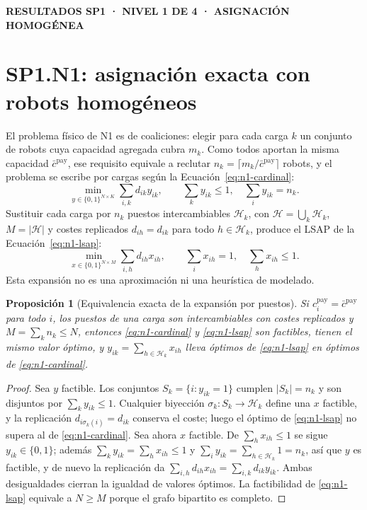 \documentclass[12pt,a4paper]{article}
\newcommand{\leveltag}[1]{%
  \noindent\colorbox{VIUDark}{%
    \parbox{\dimexpr\textwidth-2\fboxsep\relax}{%
      \color{white}\sffamily\bfseries\small #1%
    }%
  }\par\smallskip
}
\newtheorem{n1prop}{Proposición}
\begin{document}
\clearpage

\leveltag{RESULTADOS SP1 · NIVEL 1 DE 4 · ASIGNACIÓN HOMOGÉNEA}
\section*{SP1.N1: asignación exacta con robots homogéneos}

El problema físico de N1 es de coaliciones: elegir para cada carga $k$ un
conjunto de robots cuya capacidad agregada cubra $m_k$. Como todos aportan la
misma capacidad $\bar c^{\mathrm{pay}}$, ese requisito equivale a reclutar
$n_k=\lceil m_k/\bar c^{\mathrm{pay}}\rceil$ robots, y el problema se escribe
por cargas según la Ecuación~\eqref{eq:n1-cardinal}:
\begin{equation}
\label{eq:n1-cardinal}
 \min_{y\in\{0,1\}^{N\times K}}\sum_{i,k}d_{ik}y_{ik},\qquad
 \sum_{k}y_{ik}\leq1,\quad \sum_{i}y_{ik}=n_k .
\end{equation}
Sustituir cada carga por $n_k$ puestos intercambiables $\mathcal H_k$, con
$\mathcal H=\bigcup_k\mathcal H_k$, $M=|\mathcal H|$ y costes replicados
$d_{ih}=d_{ik}$ para todo $h\in\mathcal H_k$, produce el LSAP de la
Ecuación~\eqref{eq:n1-lsap}:
\begin{equation}
\label{eq:n1-lsap}
 \min_{x\in\{0,1\}^{N\times M}}\sum_{i,h}d_{ih}x_{ih},\qquad
 \sum_i x_{ih}=1,\quad \sum_hx_{ih}\leq1.
\end{equation}
Esta expansión no es una aproximación ni una heurística de modelado.

\begin{n1prop}[Equivalencia exacta de la expansión por puestos]
\label{prop:n1-slots}
Si $c_i^{\mathrm{pay}}=\bar c^{\mathrm{pay}}$ para todo $i$, los puestos de una
carga son intercambiables con costes replicados y $M=\sum_kn_k\leq N$, entonces
\eqref{eq:n1-cardinal} y \eqref{eq:n1-lsap} son factibles, tienen el mismo
valor óptimo, y $y_{ik}=\sum_{h\in\mathcal H_k}x_{ih}$ lleva óptimos de
\eqref{eq:n1-lsap} en óptimos de \eqref{eq:n1-cardinal}.
\end{n1prop}

{\small
\begin{proof}
Sea $y$ factible. Los conjuntos $S_k=\{i:y_{ik}=1\}$ cumplen $|S_k|=n_k$ y son
disjuntos por $\sum_ky_{ik}\leq1$. Cualquier biyección
$\sigma_k\colon S_k\to\mathcal H_k$ define una $x$ factible, y la replicación
$d_{i\sigma_k(i)}=d_{ik}$ conserva el coste; luego el óptimo de
\eqref{eq:n1-lsap} no supera al de \eqref{eq:n1-cardinal}. Sea ahora $x$
factible. De $\sum_hx_{ih}\leq1$ se sigue $y_{ik}\in\{0,1\}$; además
$\sum_ky_{ik}=\sum_hx_{ih}\leq1$ y
$\sum_iy_{ik}=\sum_{h\in\mathcal H_k}1=n_k$, así que $y$ es factible, y de nuevo
la replicación da $\sum_{i,h}d_{ih}x_{ih}=\sum_{i,k}d_{ik}y_{ik}$. Ambas
desigualdades cierran la igualdad de valores óptimos. La factibilidad de
\eqref{eq:n1-lsap} equivale a $N\geq M$ porque el grafo bipartito es completo.
\end{proof}
}
\end{document}
